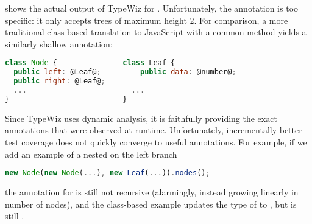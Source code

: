  shows the actual output of TypeWiz for .
Unfortunately, the annotation is too specific: it only accepts trees of maximum height 2.
For comparison, a more traditional class-based translation to JavaScript with
a common  method yields a similarly shallow annotation:
\begin{lstlisting}[language=JavaScript]
class Node {               class Leaf { 
  public left: @Leaf@;         public data: @number@;
  public right: @Leaf@;
  ...                        ...
}                          }
\end{lstlisting}

Since TypeWiz uses dynamic analysis, it is faithfully
providing the exact annotations that were observed at runtime.
Unfortunately, incrementally better test coverage does not quickly converge
to useful annotations.
For example, if we add an example of a nested 
on the left branch
\begin{lstlisting}[language=JavaScript]
new Node(new Node(...), new Leaf(...)).nodes();
\end{lstlisting}
the annotation for  is still not recursive (alarmingly, instead
growing linearly in number of nodes), and the class-based
example updates the type of  to ,
but  is still .


